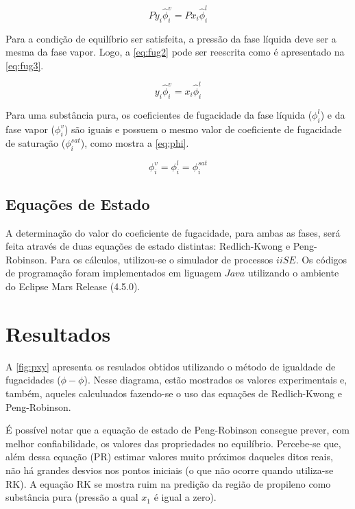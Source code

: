 \begin{equation}\label{eq:fug2}
Py_i\hat{\phi}_i^v = Px_i\hat{\phi}_i^l
\end{equation}

Para a condição de equilíbrio ser satisfeita, a pressão da fase líquida deve ser
a mesma da fase vapor. Logo, a \autoref{eq:fug2} pode ser reescrita como é
apresentado na \autoref{eq:fug3}.

\begin{equation}\label{eq:fug3}
y_i\hat{\phi}_i^v = x_i\hat{\phi}_i^l
\end{equation}

Para uma substância pura, os coeficientes de fugacidade da fase líquida
($\phi_i^l$) e da fase vapor ($\phi_i^v$) são iguais e possuem o mesmo valor de
coeficiente de fugacidade de saturação ($\phi_i^{sat}$), como mostra a
\autoref{eq:phi}.

\begin{equation}\label{eq:phi}
\phi_i^v = \phi_i^l = \phi_i^{sat}
\end{equation}



\subsection{Equações de Estado}
A determinação do valor do coeficiente de fugacidade, para ambas as fases, será
feita através de duas equações de estado distintas: Redlich-Kwong e
Peng-Robinson. Para os cálculos, utilizou-se o simulador de
processos $iiSE$. Os códigos de programação foram implementados em
liguagem $Java$ utilizando o ambiente do Eclipse Mars Release (4.5.0).



\section{Resultados} 

A \autoref{fig:pxy} apresenta os resulados obtidos utilizando o método de
igualdade de fugacidades ($\phi-\phi$). Nesse diagrama, estão mostrados os
valores experimentais e, também, aqueles calculuados fazendo-se o
uso das equações de Redlich-Kwong e Peng-Robinson.

É possível notar que a equação de estado de Peng-Robinson consegue prever, com
melhor confiabilidade, os valores das propriedades no equilíbrio. Percebe-se
que, além dessa equação (PR) estimar valores muito próximos daqueles ditos
reais, não há grandes desvios nos pontos iniciais (o que não ocorre quando
utiliza-se RK). A equação RK se mostra ruim na predição da região de propileno
como substância pura (pressão a qual $x_1$ é igual a zero).


